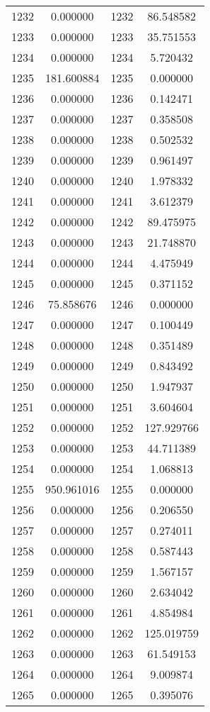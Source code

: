\documentclass[12pt]{article}
\begin{document}
\begin{longtable}{@{}cccc@{}}
1232 & 0.000000 & 1232 & 86.548582 \\
1233 & 0.000000 & 1233 & 35.751553 \\
1234 & 0.000000 & 1234 & 5.720432 \\
1235 & 181.600884 & 1235 & 0.000000 \\
1236 & 0.000000 & 1236 & 0.142471 \\
1237 & 0.000000 & 1237 & 0.358508 \\
1238 & 0.000000 & 1238 & 0.502532 \\
1239 & 0.000000 & 1239 & 0.961497 \\
1240 & 0.000000 & 1240 & 1.978332 \\
1241 & 0.000000 & 1241 & 3.612379 \\
1242 & 0.000000 & 1242 & 89.475975 \\
1243 & 0.000000 & 1243 & 21.748870 \\
1244 & 0.000000 & 1244 & 4.475949 \\
1245 & 0.000000 & 1245 & 0.371152 \\
1246 & 75.858676 & 1246 & 0.000000 \\
1247 & 0.000000 & 1247 & 0.100449 \\
1248 & 0.000000 & 1248 & 0.351489 \\
1249 & 0.000000 & 1249 & 0.843492 \\
1250 & 0.000000 & 1250 & 1.947937 \\
1251 & 0.000000 & 1251 & 3.604604 \\
1252 & 0.000000 & 1252 & 127.929766 \\
1253 & 0.000000 & 1253 & 44.711389 \\
1254 & 0.000000 & 1254 & 1.068813 \\
1255 & 950.961016 & 1255 & 0.000000 \\
1256 & 0.000000 & 1256 & 0.206550 \\
1257 & 0.000000 & 1257 & 0.274011 \\
1258 & 0.000000 & 1258 & 0.587443 \\
1259 & 0.000000 & 1259 & 1.567157 \\
1260 & 0.000000 & 1260 & 2.634042 \\
1261 & 0.000000 & 1261 & 4.854984 \\
1262 & 0.000000 & 1262 & 125.019759 \\
1263 & 0.000000 & 1263 & 61.549153 \\
1264 & 0.000000 & 1264 & 9.009874 \\
1265 & 0.000000 & 1265 & 0.395076 \\

\end{longtable}
\end{document}
